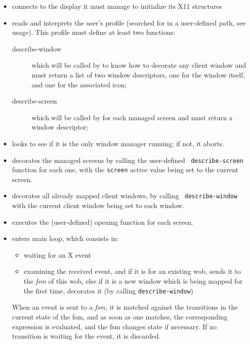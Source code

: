 \begin{itemize}

\item connects to the display it must manage to initialize its X11 structures

\item reads and interprets the user's {\WOOL} profile (searched for in a
user-defined path, see usage). This profile must define at least two
{\WOOL} functions:

\begin{description}
\item[describe-window] which will be called by {\GWM} to know how to decorate
any client window and must return a list of two window descriptors, one for
the window itself, and one for the associated icon;
\item[describe-screen] which will be called by {\GWM} for each managed
screen and must return a window descriptor;
\end{description}

\item looks to see if it is the only window manager running; if not, it
aborts.

\item decorates the managed screens by calling the user-defined {\tt
describe-screen} function for each one, with the \verb"screen" active value
being set to the current screen.

\item decorates all already mapped client windows, by calling {\tt
describe-window} with the current client window being set to each window.

\item executes the (user-defined) opening function for each screen.

\item enters {\GWM} main loop, which consists in:

\begin{itemize}
\item waiting for an X event

\item examining the received event, and if it is for an existing wob, sends
it to the {\em fsm} of this wob, else if it is a new window which is being
mapped for the first time, decorates it (by calling {\tt describe-window})
\end{itemize}

When an event is sent to a {\em fsm}, it is matched against the
transitions in the current state of the fsm, and as soon as one matches, the
corresponding {\WOOL} expression is evaluated, and the fsm changes state if
necessary. If no transition is waiting for the event, it is discarded.

\end{itemize}


